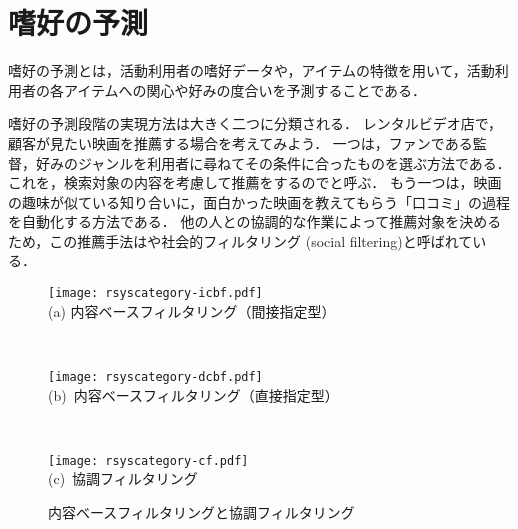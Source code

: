 \chapter{嗜好の予測}
\label{sec:cfcbf}

嗜好の予測とは，活動利用者の嗜好データや，アイテムの特徴を用いて，活動利用者の各アイテムへの関心や好みの度合いを予測することである．

嗜好の予測段階の実現方法は大きく二つに分類される．
レンタルビデオ店で，顧客が見たい映画を推薦する場合を考えてみよう．
一つは，ファンである監督，好みのジャンルを利用者に尋ねてその条件に合ったものを選ぶ方法である．
これを，検索対象の内容を考慮して推薦をするのでと呼ぶ．
もう一つは，映画の趣味が似ている知り合いに，面白かった映画を教えてもらう「口コミ」の過程を自動化する方法である．
他の人との協調的な作業によって推薦対象を決めるため，この推薦手法はや社会的フィルタリング (social filtering)と呼ばれている．

\begin{figure}
\centering
\begin{minipage}{0.6\fullwidth}
\centering
\texttt{[image: rsyscategory-icbf.pdf]}\\
 (a) 内容ベースフィルタリング（間接指定型）
\end{minipage}\\\medskip
\begin{minipage}{0.6\fullwidth}
\centering
\texttt{[image: rsyscategory-dcbf.pdf]}\\
 (b)~内容ベースフィルタリング（直接指定型）
\end{minipage}\\\medskip
\begin{minipage}{0.6\fullwidth}
\centering
\texttt{[image: rsyscategory-cf.pdf]}\\
 (c)~協調フィルタリング
\end{minipage}
\caption{内容ベースフィルタリングと協調フィルタリング}
\label{fig:cfcbf}
\end{figure}

